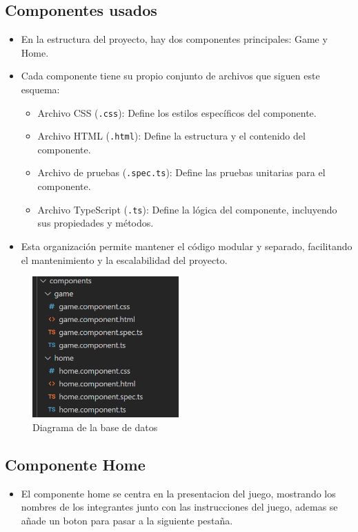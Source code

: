 \documentclass{article}
\begin{document}
	\subsection{Componentes usados}
            \begin{itemize}
                \item En la estructura del proyecto, hay dos componentes principales: Game y Home.
                \item Cada componente tiene su propio conjunto de archivos que siguen este esquema:
                \begin{itemize}
                    \item Archivo CSS (\texttt{.css}): Define los estilos específicos del componente.
                    \item Archivo HTML (\texttt{.html}): Define la estructura y el contenido del componente.
                    \item Archivo de pruebas (\texttt{.spec.ts}): Define las pruebas unitarias para el componente.
                    \item Archivo TypeScript (\texttt{.ts}): Define la lógica del componente, incluyendo sus propiedades y métodos.
                \end{itemize}
                \item Esta organización permite mantener el código modular y separado, facilitando el mantenimiento y la escalabilidad del proyecto.
            \end{itemize}
            \begin{figure}[h]
                \centering
                \includegraphics[width=0.5\textwidth]{img/components.png}
                \caption{Diagrama de la base de datos}
                \label{fig:modelo_bd}
            \end{figure}

  
\subsection{Componente Home}
\begin{itemize}
    \item El componente home se centra en la presentacion del juego, mostrando los nombres de los integrantes junto con las instrucciones del juego, ademas se añade un boton para pasar a la siguiente pestaña.
\end{itemize}
\end{document}
